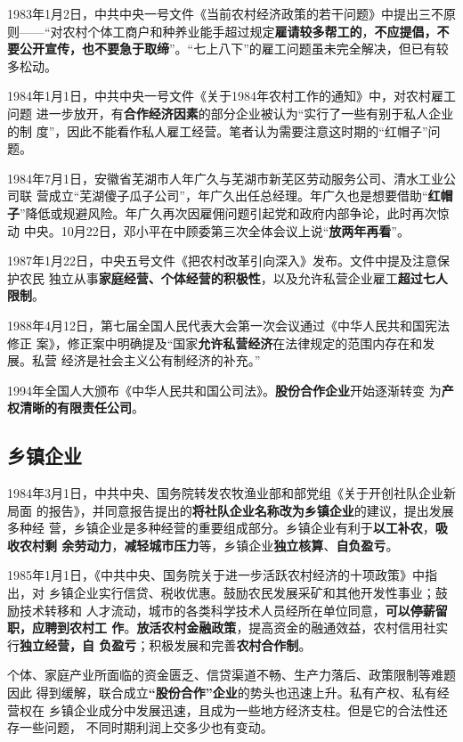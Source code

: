 1983年1月2日，中共中央一号文件《当前农村经济政策的若干问题》中提出三不原
则——“对农村个体工商户和种养业能手超过规定\textbf{雇请较多帮工的}，\textbf{不应提倡，不
  要公开宣传，也不要急于取缔}”。“七上八下”的雇工问题虽未完全解决，但已有较
多松动。

1984年1月1日，中共中央一号文件《关于1984年农村工作的通知》中，对农村雇工问题
进一步放开，有\textbf{合作经济因素}的部分企业被认为“实行了一些有别于私人企业的制
度”，因此不能看作私人雇工经营。笔者认为需要注意这时期的“红帽子”问题。

1984年7月1日，安徽省芜湖市人年广久与芜湖市新芜区劳动服务公司、清水工业公司联
营成立“芜湖傻子瓜子公司”，年广久出任总经理。年广久也是想要借助“\textbf{红帽
  子}”降低或规避风险。年广久再次因雇佣问题引起党和政府内部争论，此时再次惊动
中央。10月22日，邓小平在中顾委第三次全体会议上说“\textbf{放两年再看}”。

1987年1月22日，中央五号文件《把农村改革引向深入》发布。文件中提及注意保护农民
独立从事\textbf{家庭经营、个体经营的积极性}，以及允许私营企业雇工\textbf{超过七人限制}。

1988年4月12日，第七届全国人民代表大会第一次会议通过《中华人民共和国宪法修正
案》，修正案中明确提及“国家\textbf{允许私营经济}在法律规定的范围内存在和发展。私营
经济是社会主义公有制经济的补充。”

1994年全国人大颁布《中华人民共和国公司法》。\textbf{股份合作企业}开始逐渐转变
为\textbf{产权清晰的有限责任公司}。

\subsection{乡镇企业}




1984年3月1日，中共中央、国务院转发农牧渔业部和部党组《关于开创社队企业新局面
的报告》，并同意报告提出的\textbf{将社队企业名称改为乡镇企业}的建议，提出发展多种经
营，乡镇企业是多种经营的重要组成部分。乡镇企业有利于\textbf{以工补农}，\textbf{吸收农村剩
  余劳动力}，\textbf{减轻城市压力}等，乡镇企业\textbf{独立核算}、\textbf{自负盈亏}。

1985年1月1日，《中共中央、国务院关于进一步活跃农村经济的十项政策》中指出，对
乡镇企业实行信贷、税收优惠。鼓励农民发展采矿和其他开发性事业；鼓励技术转移和
人才流动，城市的各类科学技术人员经所在单位同意，\textbf{可以停薪留职，应聘到农村工
  作}。\textbf{放活农村金融政策}，提高资金的融通效益，农村信用社实行\textbf{独立经营，自
  负盈亏}；积极发展和完善\textbf{农村合作制}。

个体、家庭产业所面临的资金匮乏、信贷渠道不畅、生产力落后、政策限制等难题因此
得到缓解，联合成立\textbf{“股份合作”企业}的势头也迅速上升。私有产权、私有经营权在
乡镇企业成分中发展迅速，且成为一些地方经济支柱。但是它的合法性还存一些问题，
不同时期利润上交多少也有变动。

